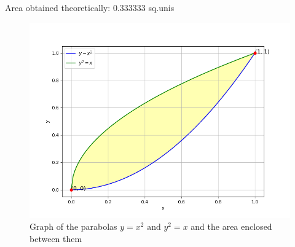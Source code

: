 \documentclass[journal]{IEEEtran}
\begin{document}
Area obtained theoretically: $ 0.333333$ sq.unis
\begin{figure}[h!]
   \centering
   \includegraphics[width=1\columnwidth]{figs/Figure_1.png}
   \caption{Graph of the parabolas $y=x^2 \text{ and } y^2=x $ and the area enclosed between them}
   \label{stemplot}
\end{figure}
\end{document}
